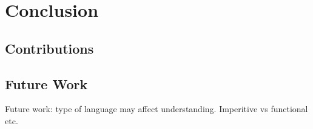 
\chapter{Conclusion}

\section{Contributions}

\section{Future Work}

Future work: type of language may affect understanding. Imperitive vs functional etc.
